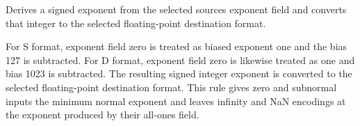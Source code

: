 Derives a signed exponent from the selected source\textquotesingle{}s exponent field and converts that integer to the selected floating-point destination format.

For S format, exponent field zero is treated as biased exponent one and the bias 127 is subtracted. For D format, exponent field zero is likewise treated as one and bias 1023 is subtracted. The resulting signed integer exponent is converted to the selected floating-point destination format. This rule gives zero and subnormal inputs the minimum normal exponent and leaves infinity and NaN encodings at the exponent produced by their all-ones field.
